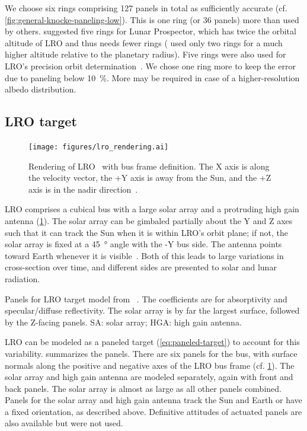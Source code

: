 We choose six rings comprising 127 panels in total as sufficiently accurate (cf. \cref{fig:general-knocke-paneling-low}). This is one ring (or 36 panels) more than used by others. \citeauthor{Floberghagen1999} suggested five rings for Lunar Prospector, which has twice the orbital altitude of \gls{LRO} and thus needs fewer rings (\citeauthor{Knocke1988} used only two rings for a much higher altitude relative to the planetary radius). Five rings were also used for \gls{LRO}'s precision orbit determination~\cite{Nicholson2010}. We chose one ring more to keep the error due to paneling below \qty{10}{\percent}. More may be required in case of a higher-resolution albedo distribution.




\subsection{LRO target}
\label{subsec:lro-target}

\begin{figure}[b]
    \centering
    \texttt{[image: figures/lro\_rendering.ai]}
    \caption{Rendering of \gls{LRO}~\cite{NSMD2018} with bus frame definition. The X axis is along the velocity vector, the +Y axis is away from the Sun, and the +Z axis is in the nadir direction~\cite{Tooley2010}.}
    \label{fig:lro-rendering}
\end{figure}

\gls{LRO} comprises a cubical bus with a large solar array and a protruding high gain antenna (\cref{fig:lro-rendering}). The solar array can be gimbaled partially about the Y and Z axes such that it can track the Sun when it is within \gls{LRO}'s orbit plane; if not, the solar array is fixed at a \qty{45}{\degree} angle with the -Y bus side. The antenna points toward Earth whenever it is visible~\cite{Mazarico2018}. Both of this leads to large variations in cross-section over time, and different sides are presented to solar and lunar radiation.


\begin{table}[t]
    \centering
    \caption{Panels for \gls{LRO} target model from \citeauthor{Smith2008}~\cite{Smith2008}. The coefficients are for absorptivity and specular/diffuse reflectivity. The solar array is by far the largest surface, followed by the Z-facing panels. SA: solar array; HGA: high gain antenna.}
    \label{tab:target-model}
    
\end{table}

\gls{LRO} can be modeled as a paneled target (\cref{eq:paneled-target}) to account for this variability.  summarizes the panels. There are six panels for the bus, with surface normals along the positive and negative axes of the \gls{LRO} bus frame (cf. \cref{fig:lro-rendering}). The solar array and high gain antenna are modeled separately, again with front and back panels. The solar array is almost as large as all other panels combined. Panels for the solar array and high gain antenna track the Sun and Earth or have a fixed orientation, as described above. Definitive attitudes of actuated panels are also available but were not used.


